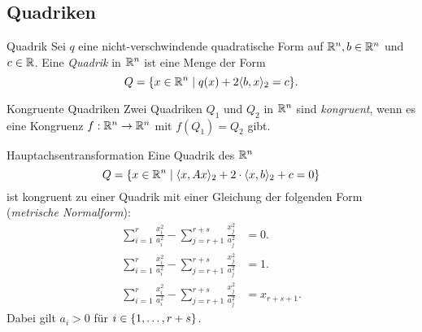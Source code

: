 \documentclass[main.tex]{subfiles}
\begin{document}
\subsection*{Quadriken}

\begin{karte}{Quadrik}
    Sei \( q \) eine nicht-verschwindende quadratische 
    Form auf \( \mathbb{R}^n, b\in \mathbb{R}^n \) und \( c\in \mathbb{R} \). 
    Eine \textit{Quadrik} in \( \mathbb{R}^n \) ist eine Menge 
    der Form 
    \[ Q = \{x \in \mathbb{R}^n \;\vert\; q(x) + 2\langle b, x \rangle_2 = c\}. \]
\end{karte}

\begin{karte}{Kongruente Quadriken}
    Zwei Quadriken \(Q_1\) und \(Q_2\) in 
    \(\mathbb{R}^n\) sind \textit{kongruent}, wenn es 
    eine Kongruenz \( f : \mathbb{R}^n \rightarrow \mathbb{R}^n \) 
    mit \( f(Q_1) = Q_2 \) gibt.
\end{karte}

\begin{karte}{Hauptachsentransformation}
    Eine Quadrik des \( \mathbb{R}^n \) 
    \[ Q = \{ x\in \mathbb{R}^n \;\vert\; \langle x, Ax \rangle_2 
    + 2 \cdot \langle x, b \rangle_2 + c = 0 \} \]
    ist kongruent zu einer Quadrik mit einer Gleichung der 
    folgenden Form (\textit{metrische Normalform}):
    \begin{align*}
        \sum_{i=1}^r \frac{x_i^2}{a_i^2} - \sum_{j=r+1}^{r+s} \frac{x_j^2}{a_j^2} &= 0. \\
        \sum_{i=1}^r \frac{x_i^2}{a_i^2} - \sum_{j=r+1}^{r+s} \frac{x_j^2}{a_j^2} &= 1. \\
        \sum_{i=1}^r \frac{x_i^2}{a_i^2} - \sum_{j=r+1}^{r+s} \frac{x_j^2}{a_j^2} &= x_{r+s+1}.
    \end{align*}
    Dabei gilt \( a_i > 0 \) für \( i \in \{1, \ldots, r+s\} \).
\end{karte}
\end{document}

